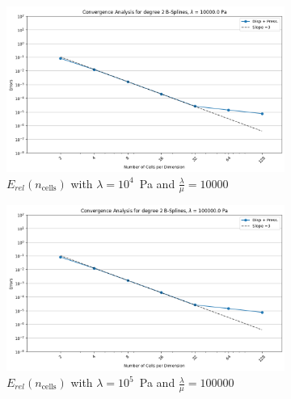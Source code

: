 \documentclass[a4paper,12pt,twoside]{report}
\begin{document}
\begin{figure}[!h] \ContinuedFloat
	\centering
	\begin{subfigure}[b]{0.49\textwidth}
		\centering
		\includegraphics[width=\textwidth]{figures/figures_mixed_DH/sum_convergence_plot_degree_2_lambda=10000.0.png}
		\caption{$E_{rel}(n_{\text{cells}})$ with $\lambda = 10^4$~Pa and $\frac{\lambda}{\mu} = 10000$}
		\label{fig:convergencedegree2mixeddirichlethomogeneouslambda10000}
	\end{subfigure}
	\begin{subfigure}[b]{0.49\textwidth}
		\centering
		\includegraphics[width=\textwidth]{figures/figures_mixed_DH/sum_convergence_plot_degree_2_lambda=100000.0.png}
		\caption{$E_{rel}(n_{\text{cells}})$ with $\lambda = 10^5$~Pa and $\frac{\lambda}{\mu} = 100000$}
		\label{fig:convergencedegree2mixeddirichlethomogeneouslambda100000}
	\end{subfigure}
	\begin{subfigure}[b]{0.49\textwidth}
		\centering

\end{subfigure}
\end{figure}
\end{document}
